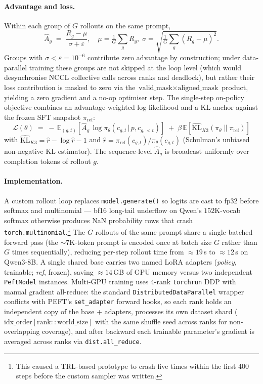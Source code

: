 \paragraph{Advantage and loss.}
Within each group of $G$ rollouts on the same prompt,
\begin{equation}
\hat{A}_g \;=\; \frac{R_g-\mu}{\sigma+\varepsilon},\quad
\mu=\tfrac{1}{G}\!\sum_g R_g,\;
\sigma=\sqrt{\tfrac{1}{G}\!\sum_g (R_g-\mu)^2}.
\end{equation}
Groups with $\sigma\!<\!\varepsilon\!=\!10^{-6}$ contribute zero
advantage by construction; under data-parallel training these groups
are not skipped at the loop level (which would desynchronise NCCL
collective calls across ranks and deadlock), but rather their loss
contribution is masked to zero via the
$\text{valid\_mask}\!\times\!\text{aligned\_mask}$ product, yielding a
zero gradient and a no-op optimiser step. The single-step on-policy
objective combines an advantage-weighted log-likelihood and a KL
anchor against the frozen SFT snapshot $\pi_\text{ref}$:
\begin{equation}
\mathcal{L}(\theta)
\;=\;
-\,\mathbb{E}_{(g,t)}\!\left[\hat{A}_g\,\log\pi_\theta(c_{g,t}\,|\,p,c_{g,<t})\right]
\;+\;\beta\,\mathbb{E}\!\left[\widehat{\text{KL}}_{K3}(\pi_\theta\!\parallel\!\pi_\text{ref})\right]
\end{equation}
with $\widehat{\text{KL}}_{K3}=\hat{r}-\log\hat{r}-1$ and
$\hat{r}=\pi_\text{ref}(c_{g,t})/\pi_\theta(c_{g,t})$ (Schulman's
unbiased non-negative KL estimator). The sequence-level $\hat{A}_g$ is
broadcast uniformly over completion tokens of rollout $g$.

\paragraph{Implementation.}
A custom rollout loop replaces \texttt{model.generate()} so logits are
cast to fp32 before softmax and multinomial — bf16 long-tail underflow
on Qwen's $152$K-vocab softmax otherwise produces NaN probability rows
that crash \texttt{torch.multinomial}.\footnote{This caused a
TRL-based prototype to crash five times within the first $400$ steps
before the custom sampler was written.} The $G$ rollouts of the same
prompt share a single batched forward pass (the $\sim 7$K-token
prompt is encoded once at batch size $G$ rather than $G$ times
sequentially), reducing per-step rollout time from $\approx 19$\,s to
$\approx 12$\,s on Qwen3-8B. A single shared base carries two named
LoRA adapters (\textit{policy}, trainable; \textit{ref}, frozen),
saving $\approx 14$\,GB of GPU memory versus two independent
\texttt{PeftModel} instances. Multi-GPU training uses 4-rank
\texttt{torchrun} DDP with manual gradient all-reduce: the standard
\texttt{DistributedDataParallel} wrapper conflicts with PEFT's
\texttt{set\_adapter} forward hooks, so each rank holds an independent
copy of the base + adapters, processes its own dataset shard
($\text{idx\_order}[\text{rank}::\text{world\_size}]$ with the same
shuffle seed across ranks for non-overlapping coverage), and after
backward each trainable parameter's gradient is averaged across ranks
via \texttt{dist.all\_reduce}.

